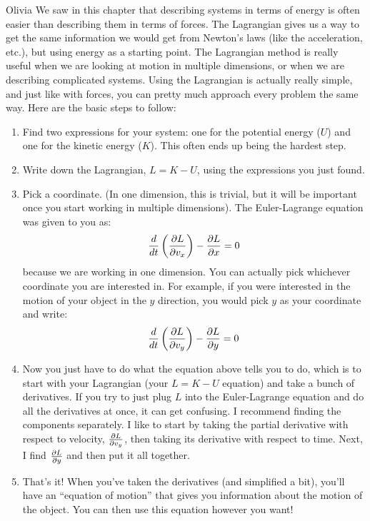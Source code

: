 \begin{studentOpinion}{Olivia}
We saw in this chapter that describing systems in terms of energy is often easier than describing them in terms of forces. The Lagrangian gives us a way to get the same information we would get from Newton's laws (like the acceleration, etc.), but using energy as a starting point. The Lagrangian method is really useful when we are looking at motion in multiple dimensions, or when we are describing complicated systems. Using the Lagrangian is actually really simple, and just like with forces, you can pretty much approach every problem the same way. Here are the basic steps to follow:
\begin{enumerate}
\item Find two expressions for your system: one for the potential energy ($U$) and one for the kinetic energy ($K$). This often ends up being the hardest step.
\item Write down the Lagrangian, $L=K-U$, using the expressions you just found.
\item Pick a coordinate. (In one dimension, this is trivial, but it will be important once you start working in multiple dimensions). The Euler-Lagrange equation was given to you as:
\begin{align*}
\frac{d}{dt}\left(\frac{\partial L}{\partial v_x}\right)-\frac{\partial L}{\partial x} = 0
\end{align*}
because we are working in one dimension. You can actually pick whichever coordinate you are interested in. For example, if you were interested in the motion of your object in the $y$ direction, you would pick $y$ as your coordinate and write:
\begin{align*}
\frac{d}{dt}\left(\frac{\partial L}{\partial v_y}\right)-\frac{\partial L}{\partial y} = 0
\end{align*}
\item Now you just have to do what the equation above tells you to do, which is to start with your Lagrangian (your $L=K-U$ equation) and take a bunch of derivatives. If you try to just plug $L$ into the Euler-Lagrange equation and do all the derivatives at once, it can get confusing. I recommend finding the components separately. I like to start by taking the partial derivative with respect to velocity, $\frac{\partial L}{\partial v_y}$, then taking its derivative with respect to time. Next, I find $\frac{\partial L}{\partial y}$ and then put it all together.
\item That's it! When you've taken the derivatives (and simplified a bit), you'll have an ``equation of motion'' that gives you information about the motion of the object. You can then use this equation however you want! 
\end{enumerate}
\end{studentOpinion}

